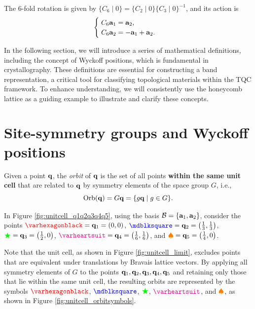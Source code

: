 The 6-fold rotation is given by $\{C_6 \mid 0\} = \{C_2 \mid 0\} \{C_3 \mid 0\}^{-1}$, and its action is
\begin{equation} \label{eq:C6_rotation_P6mm}
\begin{cases}
\; C_6 {\vb{a}}_1 = {\vb{a}}_2, \\
\; C_6 {\vb{a}}_2 = -{\vb{a}}_1 + {\vb{a}}_2.
\end{cases}
\end{equation}

In the following section, we will introduce a series of mathematical definitions, including the concept of Wyckoff positions, which is fundamental in crystallography. These definitions are essential for constructing a band representation, a critical tool for classifying topological materials within the TQC framework. To enhance understanding, we will consistently use the honeycomb lattice as a guiding example to illustrate and clarify these concepts.

\section{Site-symmetry groups and Wyckoff positions}


\begin{definition} \label{def:orbit_q}
Given a point \({\vb{q}}\), the \textit{orbit} of \({\vb{q}}\) is the set of all points \textbf{within the same unit cell} that are related to \({\vb{q}}\) by symmetry elements of the space group \(G\), i.e.,
\begin{equation} \label{eq:orbit_of_q}
\text{Orb}({\vb{q}}) = G {\vb{q}} = \{g {\vb{q}} \mid g \in G\}.
\end{equation}
\end{definition}

\begin{example} \label{ex:orbit_1a2b3c}
In Figure \ref{fig:unitcell_q1q2q3q4q5}, using the basis $\mathcal{B} = \{{\vb{a}}_1, {\vb{a}}_2\}$, consider the points \(\textcolor{red}{\varhexagonblack} = \q_1 = (0,0)\), \(\textcolor{blue}{\mdblksquare} = \q_2 = \qty(\frac{1}{3}, \frac{1}{3})\), \(\textcolor{green}{\bigstar} = {\vb{q}}_3 = \qty(\frac{1}{2}, 0)\), \(\textcolor{magenta}{\varheartsuit} = \q_4 = \qty(\frac{1}{6}, \frac{1}{6})\), and \(\textcolor{orange}{\spadesuit} = {\vb{q}}_5 = \qty(\frac{1}{4}, 0)\).

Note that the unit cell, as shown in Figure \ref{fig:unitcell_limit}, excludes points that are equivalent under translations by Bravais lattice vectors. By applying all symmetry elements of \(G\) to the points \({\vb{q}}_1, {\vb{q}}_2, {\vb{q}}_3, {\vb{q}}_4, {\vb{q}}_5\) and retaining only those that lie within the same unit cell, the resulting orbits are represented by the symbols \(\textcolor{red}{\varhexagonblack}\), \(\textcolor{blue}{\mdblksquare}\), \(\textcolor{green}{\bigstar}\), \(\textcolor{magenta}{\varheartsuit}\), and \(\textcolor{orange}{\spadesuit}\), as shown in Figure \ref{fig:unitcell_orbitsymbols}.
\end{example}

